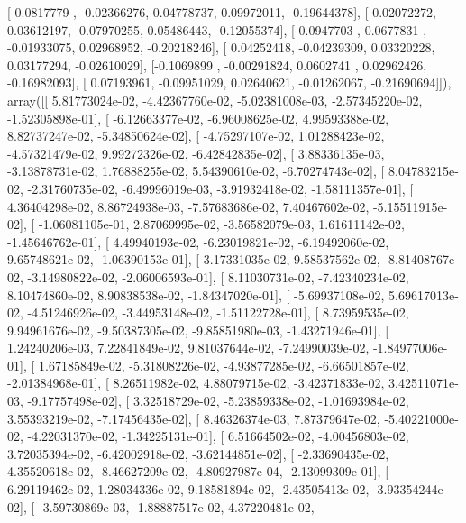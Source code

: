 \documentclass{article}
\begin{document}
       [-0.0817779 , -0.02366276,  0.04778737,  0.09972011, -0.19644378],
       [-0.02072272,  0.03612197, -0.07970255,  0.05486443, -0.12055374],
       [-0.0947703 ,  0.0677831 , -0.01933075,  0.02968952, -0.20218246],
       [ 0.04252418, -0.04239309,  0.03320228,  0.03177294, -0.02610029],
       [-0.1069899 , -0.00291824,  0.0602741 ,  0.02962426, -0.16982093],
       [ 0.07193961, -0.09951029,  0.02640621, -0.01262067, -0.21690694]]), array([[  5.81773024e-02,  -4.42367760e-02,  -5.02381008e-03,
         -2.57345220e-02,  -1.52305898e-01],
       [ -6.12663377e-02,  -6.96008625e-02,   4.99593388e-02,
          8.82737247e-02,  -5.34850624e-02],
       [ -4.75297107e-02,   1.01288423e-02,  -4.57321479e-02,
          9.99272326e-02,  -6.42842835e-02],
       [  3.88336135e-03,  -3.13878731e-02,   1.76888255e-02,
          5.54390610e-02,  -6.70274743e-02],
       [  8.04783215e-02,  -2.31760735e-02,  -6.49996019e-03,
         -3.91932418e-02,  -1.58111357e-01],
       [  4.36404298e-02,   8.86724938e-03,  -7.57683686e-02,
          7.40467602e-02,  -5.15511915e-02],
       [ -1.06081105e-01,   2.87069995e-02,  -3.56582079e-03,
          1.61611142e-02,  -1.45646762e-01],
       [  4.49940193e-02,  -6.23019821e-02,  -6.19492060e-02,
          9.65748621e-02,  -1.06390153e-01],
       [  3.17331035e-02,   9.58537562e-02,  -8.81408767e-02,
         -3.14980822e-02,  -2.06006593e-01],
       [  8.11030731e-02,  -7.42340234e-02,   8.10474860e-02,
          8.90838538e-02,  -1.84347020e-01],
       [ -5.69937108e-02,   5.69617013e-02,  -4.51246926e-02,
         -3.44953148e-02,  -1.51122728e-01],
       [  8.73959535e-02,   9.94961676e-02,  -9.50387305e-02,
         -9.85851980e-03,  -1.43271946e-01],
       [  1.24240206e-03,   7.22841849e-02,   9.81037644e-02,
         -7.24990039e-02,  -1.84977006e-01],
       [  1.67185849e-02,  -5.31808226e-02,  -4.93877285e-02,
         -6.66501857e-02,  -2.01384968e-01],
       [  8.26511982e-02,   4.88079715e-02,  -3.42371833e-02,
          3.42511071e-03,  -9.17757498e-02],
       [  3.32518729e-02,  -5.23859338e-02,  -1.01693984e-02,
          3.55393219e-02,  -7.17456435e-02],
       [  8.46326374e-03,   7.87379647e-02,  -5.40221000e-02,
         -4.22031370e-02,  -1.34225131e-01],
       [  6.51664502e-02,  -4.00456803e-02,   3.72035394e-02,
         -6.42002918e-02,  -3.62144851e-02],
       [ -2.33690435e-02,   4.35520618e-02,  -8.46627209e-02,
         -4.80927987e-04,  -2.13099309e-01],
       [  6.29119462e-02,   1.28034336e-02,   9.18581894e-02,
         -2.43505413e-02,  -3.93354244e-02],
       [ -3.59730869e-03,  -1.88887517e-02,   4.37220481e-02,
\end{document}
